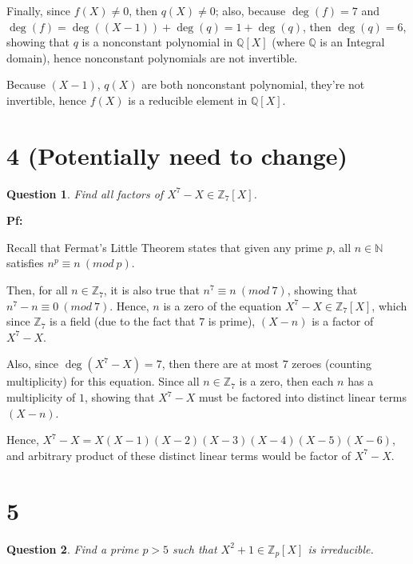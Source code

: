 \documentclass{article}
\newtheorem{question}{Question}
\begin{document}
\hfill

Finally, since $f(X)\neq 0$, then $q(X)\neq 0$; also, because $\deg(f)=7$ and $\deg(f)=\deg((X-1))+\deg(q) = 1+\deg(q)$, then $\deg(q)=6$, showing that $q$ is a nonconstant polynomial in $\mathbb{Q}[X]$ 
(where $\mathbb{Q}$ is an Integral domain), hence nonconstant polynomials are not invertible.

Because $(X-1)$, $q(X)$ are both nonconstant polynomial, they're not invertible, hence $f(X)$ is a reducible element in $\mathbb{Q}[X]$.


\break

\section*{4 (Potentially need to change)}
\begin{myBox}[]{}
    \begin{question}
        Find all factors of $X^7-X\in \mathbb{Z}_7[X]$.
    \end{question}
\end{myBox}

\textbf{Pf:}

Recall that Fermat's Little Theorem states that given any prime $p$, all $n\in\mathbb{N}$ satisfies $n^p\equiv n\ (mod\ p)$.

Then, for all $n\in\mathbb{Z}_7$, it is also true that $n^7\equiv n\ (mod\ 7)$, showing that $n^7-n\equiv 0\ (mod\ 7)$.
Hence, $n$ is a zero of the equation $X^7-X \in \mathbb{Z}_7[X]$, which since $\mathbb{Z}_7$ is a field (due to the fact that $7$ is prime),
$(X-n)$ is a factor of $X^7-X$.

Also, since $\deg(X^7-X)=7$, then there are at most $7$ zeroes (counting multiplicity) for this equation. Since all $n\in\mathbb{Z}_7$ is a zero, 
then each $n$ has a multiplicity of $1$, showing that $X^7-X$ must be factored into distinct linear terms $(X-n)$.

Hence, $X^7-X = X(X-1)(X-2)(X-3)(X-4)(X-5)(X-6)$, and arbitrary product of these distinct linear terms would be factor of $X^7-X$.

\hfill

\hfill

\section*{5}
\begin{myBox}[]{}
    \begin{question}
        Find a prime $p > 5$ such that $X^2+1\in \mathbb{Z}_p[X]$ is irreducible.
    \end{question}
\end{myBox}
\end{document}
